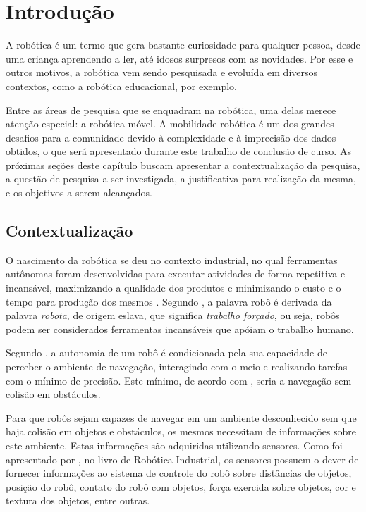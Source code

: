 \chapter[Introdução]{Introdução}

	A robótica é um termo que gera bastante curiosidade para qualquer pessoa, desde uma criança aprendendo a ler, até idosos surpresos com as novidades. Por esse e outros motivos, a robótica vem sendo pesquisada e evoluída em diversos contextos, como a robótica educacional, por exemplo. 

	Entre as áreas de pesquisa que se enquadram na robótica, uma delas merece atenção especial: a robótica móvel. A mobilidade robótica é um dos grandes desafios para a comunidade devido à complexidade e à imprecisão dos dados obtidos, o que será apresentado durante este trabalho de conclusão de curso. As próximas seções deste capítulo buscam apresentar a contextualização da pesquisa, a questão de pesquisa a ser investigada, a justificativa para realização da mesma, e os objetivos a serem alcançados. 

\section{Contextualização}
	
	O nascimento da robótica se deu no contexto industrial, no qual ferramentas autônomas foram desenvolvidas para executar atividades de forma repetitiva e incansável, maximizando a qualidade dos produtos e minimizando o custo e o tempo para produção dos mesmos \cite{roboticaIndustrial}. Segundo \cite{roboticaIndustrial}, a palavra robô é derivada da palavra \textit{robota}, de origem eslava, que significa \textit{trabalho forçado}, ou seja, robôs podem ser considerados ferramentas incansáveis que apóiam o trabalho humano. 

	Segundo \cite{localizacaoEMapeamentoPaulo}, a autonomia de um robô é condicionada pela sua capacidade de perceber o ambiente de navegação, interagindo com o meio e realizando tarefas com o mínimo de precisão. Este mínimo, de acordo com \cite{localizacaoEMapeamentoPaulo}, seria a navegação sem colisão em obstáculos.

	Para que robôs sejam capazes de navegar em um ambiente desconhecido sem que haja colisão em objetos e obstáculos, os mesmos necessitam de informações sobre este ambiente. Estas informações são adquiridas utilizando sensores. Como foi apresentado por \cite{interacaoRoboAmbiente}, no livro de Robótica Industrial, os sensores possuem o dever de fornecer informações ao sistema de controle do robô sobre distâncias de objetos, posição do robô, contato do robô com objetos, força exercida sobre objetos, cor e textura dos objetos, entre outras.

